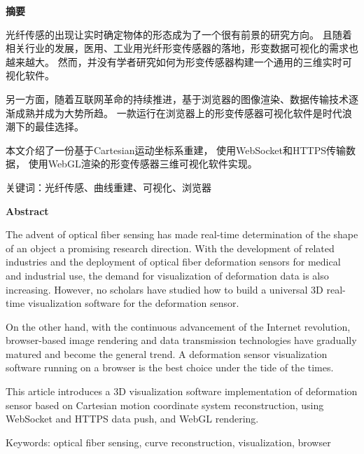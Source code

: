 \cleardoublepage{}
\begin{center}
    \bfseries {} 摘要
\end{center}

光纤传感的出现让实时确定物体的形态成为了一个很有前景的研究方向。
且随着相关行业的发展，医用、工业用光纤形变传感器的落地，形变数据可视化的需求也越来越大。
然而，并没有学者研究如何为形变传感器构建一个通用的三维实时可视化软件。

另一方面，随着互联网革命的持续推进，基于浏览器的图像渲染、数据传输技术逐渐成熟并成为大势所趋。
一款运行在浏览器上的形变传感器可视化软件是时代浪潮下的最佳选择。

本文介绍了一份基于Cartesian运动坐标系重建，
使用WebSocket和HTTPS传输数据，
使用WebGL渲染的形变传感器三维可视化软件实现。

关键词：光纤传感、曲线重建、可视化、浏览器

\cleardoublepage{}
\begin{center}
    \bfseries {} Abstract
\end{center}

The advent of optical fiber sensing has made real-time determination of the shape of an object a promising research direction. 
With the development of related industries and the deployment of optical fiber deformation sensors for medical and industrial use, 
the demand for visualization of deformation data is also increasing. 
However, no scholars have studied how to build a universal 3D real-time visualization software for the deformation sensor.

On the other hand, with the continuous advancement of the Internet revolution, 
browser-based image rendering and data transmission technologies have gradually matured and become the general trend. 
A deformation sensor visualization software running on a browser is the best choice under the tide of the times.

This article introduces a 3D visualization software implementation of deformation sensor 
based on Cartesian motion coordinate system reconstruction, using WebSocket and HTTPS data push, and WebGL rendering.

Keywords: optical fiber sensing, curve reconstruction, visualization, browser